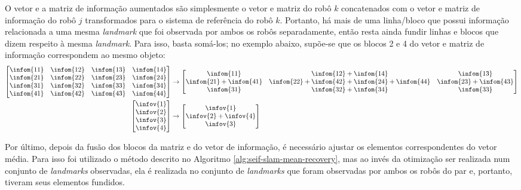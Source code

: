 O vetor e a matriz de informação aumentados são simplesmente o vetor e matriz do robô $k$ concatenados com o 
vetor e matriz de informação do robô $j$ transformados para o sistema 
de referência do robô $k$. Portanto, há mais de uma linha/bloco que 
possui informação relacionada a uma mesma \textit{landmark} que foi observada 
por ambos os robôs separadamente, então resta ainda fundir linhas e 
blocos que dizem respeito à mesma \textit{landmark}. Para isso, basta 
somá-los; no exemplo abaixo, supõe-se que os blocos 2 e 4 do vetor e 
matriz de informação correspondem ao mesmo objeto:
\begin{align}
  \begin{bmatrix}
    \infom{11} & \infom{12} & \infom{13} & \infom{14}\\
    \infom{21} & \infom{22} & \infom{23} & \infom{24}\\
    \infom{31} & \infom{32} & \infom{33} & \infom{34}\\
    \infom{41} & \infom{42} & \infom{43} & \infom{44}
  \end{bmatrix} &\rightarrow \begin{bmatrix}
    \infom{11} & \infom{12} + \infom{14} & \infom{13}\\
    \infom{21}+\infom{41} & \infom{22}+\infom{42} + \infom{24}+\infom{44} & \infom{23}+\infom{43} \\
    \infom{31} & \infom{32} + \infom{34} & \infom{33} \\
  \end{bmatrix}
  \label{eq:info-matrix-fusion}\\
  \begin{bmatrix}
    \infov{1} \\ \infov{2} \\ \infov{3} \\ \infov{4}
  \end{bmatrix} &\rightarrow \begin{bmatrix}
    \infov{1} \\ \infov{2} + \infov{4} \\ \infov{3}
  \end{bmatrix}
\end{align}

Por último, depois da fusão dos blocos da matriz e do vetor de 
informação, é necessário ajustar os elementos correspondentes do vetor 
média. Para isso foi utilizado o método descrito no Algoritmo \ref{alg:seif-slam-mean-recovery}, mas ao invés da otimização ser realizada 
num conjunto de \textit{landmarks} observadas, ela é realizada 
no conjunto 
de \textit{landmarks} que foram observadas por ambos os robôs do par e,
portanto, tiveram seus elementos fundidos.

